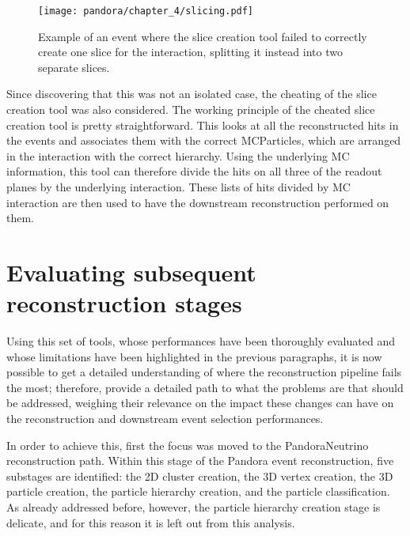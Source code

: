 \begin{figure}[!htb]
    \centering
    \texttt{[image: pandora/chapter\_4/slicing.pdf]}
    \caption[Slice creation failure mode]{Example of an event where the slice creation tool failed to correctly create one slice for the interaction, splitting it instead into two separate slices. }
    \label{fig:slicingIssue}
\end{figure}

Since discovering that this was not an isolated case, the cheating of the slice creation tool was also considered. The working principle of the cheated slice creation tool is pretty straightforward. This looks at all the reconstructed hits in the events and associates them with the correct MCParticles, which are arranged in the interaction with the correct hierarchy. Using the underlying MC information, this tool can therefore divide the hits on all three of the readout planes by the underlying interaction. These lists of hits divided by MC interaction are then used to have the downstream reconstruction performed on them. 


\section{Evaluating subsequent reconstruction stages}\label{sec:methods}

Using this set of tools, whose performances have been thoroughly evaluated and whose limitations have been highlighted in the previous paragraphs, it is now possible to get a detailed understanding of where the reconstruction pipeline fails the most; therefore, provide a detailed path to what the problems are that should be addressed, weighing their relevance on the impact these changes can have on the reconstruction and downstream event selection performances. 

In order to achieve this, first the focus was moved to the PandoraNeutrino reconstruction path. Within this stage of the Pandora event reconstruction, five substages are identified: the 2D cluster creation, the 3D vertex creation, the 3D particle creation, the particle hierarchy creation, and the particle classification. As already addressed before, however, the particle hierarchy creation stage is delicate, and for this reason it is left out from this analysis. 

